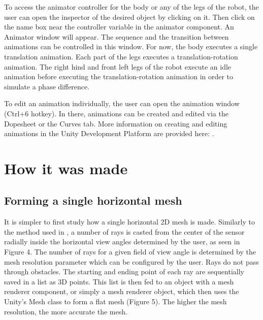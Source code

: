 \documentclass{article}
\begin{document}
To access the animator controller for the body or any of the legs of the robot, the user can open the inspector of the desired object by clicking on it. Then click on the name box near the controller variable in the animator component. An Animator window will appear. The sequence and the transition between animations can be controlled in this window. For now, the body executes a single translation animation. Each part of the legs executes a translation-rotation animation. The right hind and front left legs of the robot execute an idle animation before executing the translation-rotation animation in order to simulate a phase difference. 

To edit an animation individually, the user can open the animation window (Ctrl+6 hotkey). In there, animations can be created and edited via the Dopesheet or the Curves tab. More information on creating and editing animations in the Unity Development Platform are provided here: \cite{jonas_tyroller_how_2019} \cite{noauthor_learn_nodate}.

\section{How it was made}

\subsection{Forming a single horizontal mesh}
    
    It is simpler to first study how a single horizontal 2D mesh is made. Similarly to the method used in \cite{sebastian_lague_field_2015}, a number of rays is casted from the center of the sensor radially inside the horizontal view angles determined by the user, as seen in Figure 4. The number of rays for a given field of view angle is determined by the mesh resolution parameter which can be configured by the user. Rays do not pass through obstacles. The starting and ending point of each ray are sequentially saved in a list as 3D points. This list is then fed to an object with a mesh renderer component, or simply a mesh renderer object, which then uses the Unity's Mesh class to form a flat mesh (Figure 5). The higher the mesh resolution, the more accurate the mesh. 
    
\end{document}
